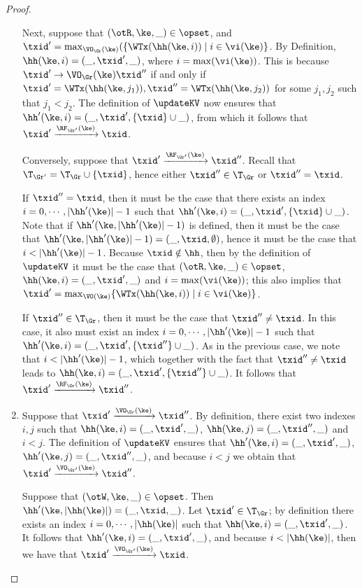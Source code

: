 \begin{proof}
\begin{enumerate}
Next, suppose that $(\otR, \ke, \_) \in \opset$, and $\txid' = \max_{\VO_{\Gr}(\ke)}(\{\WTx(\hh(\ke, i)) \mid i \in \vi(\ke)\}$. 
By Definition, $\hh(\ke, i) = (\_, \txid', \_)$, where $i = \max(\vi(\ke))$. This is because 
$\txid' \rightarrow{\VO_{\Gr}(\ke)} \txid''$ if and only if $\txid' = \WTx(\hh(\ke, j_1)), \txid'' = 
\WTx(\hh(\ke, j_2))$ for some $j_1, j_2$ such that $j_1 < j_2$. 
The definition of $\updateKV$ now ensures that $\hh'(\ke, i) = (\_, \txid', \{\txid \} \cup \_)$, 
from which it follows that $\txid' \xrightarrow{\RF_{\Gr'}(\ke)} \txid$.

Conversely, suppose that $\txid' \xrightarrow{\RF_{\Gr'}(\ke)} \txid''$. 
Recall that $\T_{\Gr'} = \T_{\Gr} \cup \{ \txid \}$, hence either 
$\txid'' \in \T_{\Gr}$ or $\txid'' = \txid$. 

If $\txid'' = \txid$, then it must be the case that there exists an index $i = 0,\cdots, \lvert \hh'(\ke) \rvert - 1$ 
such that $\hh'(\ke, i) = (\_, \txid', \{\txid \} \cup \_)$. Note that if $\hh'(\ke, \lvert \hh'(\ke) \rvert -1)$ is 
defined, then it must be the case that $\hh'(\ke, \lvert \hh'(\ke) \rvert -1) = (\_, \txid, \emptyset)$, 
hence it must be the case that $i < \lvert \hh'(\ke) \rvert - 1$. Because $\txid \notin \hh$, 
then by the definition of $\updateKV$ it must be the case that $(\otR, \ke, \_) \in \opset$, 
$\hh(\ke, i) = (\_, \txid', \_)$ and $i = \max(\vi(\ke))$; this also implies that $\txid' = 
\max_{\VO(\ke)}\{\WTx(\hh(\ke, i)) \mid i \in \vi(\ke)\}$. 

If $\txid'' \in \T_{\Gr}$, then  it must be the case that $\txid'' \neq \txid$. 
In this case, it also must exist an index $i = 0,\cdots, \lvert \hh'(\ke) \rvert - 1$ 
such that $\hh'(\ke, i) = (\_, \txid', \{\txid''\} \cup \_)$. As in the previous 
case, we note that $i < \lvert \hh'(\ke) \rvert - 1$, which together 
with the fact that $\txid'' \neq \txid$ leads to $\hh(\ke, i) = (\_, \txid', \{\txid''\} \cup \_)$. 
It follows that $\txid' \xrightarrow{\RF_{\Gr}(\ke)} \txid''$.

\item Suppose that $\txid' \xrightarrow{\VO_{\Gr}(\ke)} \txid''$. 
By definition, there exist two indexes $i, j$ such that 
$\hh(\ke, i) = (\_, \txid', \_)$, $\hh(\ke, j) = (\_, \txid'', \_)$ 
and $i < j$. The definition of $\updateKV$ ensures that 
$\hh'(\ke, i) = (\_, \txid', \_)$, $\hh'(\ke, j) = (\_, \txid'', \_)$, 
and because $i < j$ we obtain that $\txid' \xrightarrow{\VO_{\Gr'}(\ke)} \txid''$. 

Suppose that $(\otW, \ke, \_) \in \opset$. Then $\hh'(\ke, \lvert \hh(\ke) \rvert) = (\_, \txid, \_)$.
Let $\txid' \in \T_{\Gr}$; by definition there exists an index $i = 0,\cdots, \lvert \hh(\ke) \rvert$ 
such that $\hh(\ke, i) = (\_, \txid', \_)$. It follows that $\hh'(\ke, i) = (\_, \txid', \_)$, and 
because $i < \lvert \hh(\ke) \rvert$, then we have that $\txid' \xrightarrow{\VO_{\Gr'}(\ke)} \txid$. 


\end{enumerate}
\end{proof}
